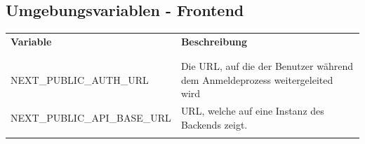 \subsection{Umgebungsvariablen - Frontend}
\begin{table}[H]
  \begin{tabularx}{\textwidth}{X X}
  \textbf{Variable} & \textbf{Beschreibung} \\ \\\hline \\
  NEXT\_PUBLIC\_AUTH\_URL & Die URL, auf die der Benutzer während dem Anmeldeprozess weitergeleited wird \\
  NEXT\_PUBLIC\_API\_BASE\_URL & URL, welche auf eine Instanz des Backends zeigt. \\
  \\\hline
  \end{tabularx}
\end{table}
